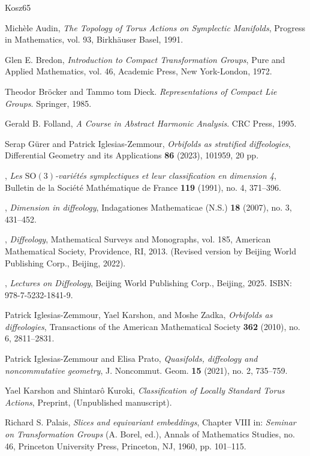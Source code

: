 \documentclass[10pt,reqno,letterpaper,twoside]{amsart}
\theoremstyle{article}
\begin{document}
  \begin{thebibliography}{Kosz65}
    
    Michèle Audin,
    \emph{The Topology of Torus Actions on Symplectic Manifolds},
    Progress in Mathematics, vol. 93, Birkhäuser Basel, 1991.
    
    Glen E. Bredon,
    \emph{Introduction to Compact Transformation Groups},
    Pure and Applied Mathematics, vol. 46, Academic Press, New York-London, 1972.
    
    Theodor Bröcker and Tammo tom Dieck.
    \emph{Representations of Compact Lie Groups}. Springer, 1985.
    
    Gerald B. Folland,
    \emph{A Course in Abstract Harmonic Analysis}.
    CRC Press, 1995.
    
    Serap G{\"u}rer and Patrick Iglesias-Zemmour,
    \emph{Orbifolds as stratified diffeologies},
    Differential Geometry and its Applications \textbf{86} (2023), 101959, 20 pp.
        
    \bysame,
    \emph{Les $\mathrm{SO}(3)$-vari{\'e}t{\'e}s symplectiques et leur classification en dimension 4},
    Bulletin de la Soci{\'e}t{\'e} Math{\'e}matique de France \textbf{119} (1991), no. 4, 371--396.
    
    \bysame,
    \emph{Dimension in diffeology},
    Indagationes Mathematicae (N.S.) \textbf{18} (2007), no. 3, 431--452.
    
    \bysame,
    \emph{Diffeology},
    Mathematical Surveys and Monographs, vol. 185, American Mathematical Society, Providence, RI, 2013.
    (Revised version by Beijing World Publishing Corp., Beijing, 2022).
    
    \bysame,
    \emph{Lectures on Diffeology},
    Beijing World Publishing Corp., Beijing, 2025. ISBN: 978-7-5232-1841-9.
    
    Patrick Iglesias-Zemmour, Yael Karshon, and Moshe Zadka,
    \emph{Orbifolds as diffeologies},
    Transactions of the American Mathematical Society \textbf{362} (2010), no. 6, 2811--2831.
        
    Patrick Iglesias-Zemmour and Elisa Prato,
    \emph{Quasifolds, diffeology and noncommutative geometry},
    J. Noncommut. Geom. \textbf{15} (2021), no. 2, 735--759.
    
    Yael Karshon and Shintar{\^o} Kuroki,
    \emph{Classification of Locally Standard Torus Actions},
    Preprint, (Unpublished manuscript).
    
    Richard S. Palais,
    \emph{Slices and equivariant embeddings},
    Chapter VIII in: \emph{Seminar on Transformation Groups} (A. Borel, ed.),
    Annals of Mathematics Studies, no. 46, Princeton University Press, Princeton, NJ, 1960, pp. 101--115.

  \end{thebibliography}
  
  
\end{document}
